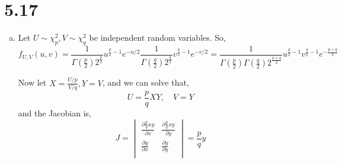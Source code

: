 \documentclass[letterpaper]{article}
\newcommand{\pbt}{\frac{p}{2}}
\newcommand{\qbt}{\frac{q}{2}}
\newcommand{\pqbt}{\frac{p+q}{2}}
\begin{document}
\section*{5.17}
\begin{enumerate}[(a)]
\item
Let $U \sim \chi^2_p, V \sim \chi^2_q$ be independent random variables. So,
\[
f_{U,V}(u, v) = \frac{1}{\Gamma(\pbt)2^{\pbt}} u^{\pbt-1} e^{-u/2} \frac{1}{\Gamma(\qbt)2^{\qbt}} v^{\qbt-1} e^{-v/2} = \frac{1}{\Gamma(\pbt)\Gamma(\qbt)2^{\pqbt}} u^{\pbt-1} v^{\qbt-1} e^{-\pqbt} 
\]

Now let $X = \frac{U/p}{V/q}, Y = V$, and we can solve that,
\[
U = \frac{p}{q} XY, \quad V = Y
\]
and the Jacobian is,
\[
J = \begin{vmatrix}
\frac{\partial \frac{p}{q} xy}{\partial x} & \frac{\partial \frac{p}{q} xy}{\partial y} \\
\frac{\partial y}{\partial x} & \frac{\partial y}{\partial y} \\
\end{vmatrix} = \frac{p}{q} y
\]


\end{enumerate}
\end{document}
